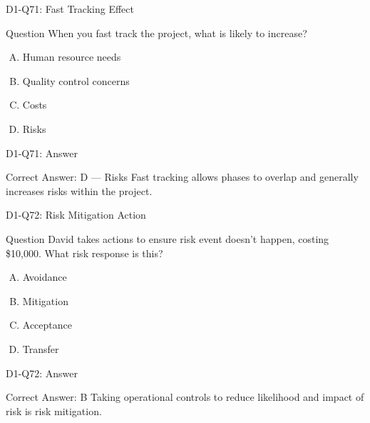\documentclass{beamer}
\begin{document}
	\begin{frame}{D1-Q71: Fast Tracking Effect}
		\begin{block}{Question}
			When you fast track the project, what is likely to increase?
		\end{block}
		\begin{enumerate}[(A)]
			\item Human resource needs
			\item Quality control concerns
			\item Costs
			\item Risks
		\end{enumerate}
	\end{frame}
	\begin{frame}{D1-Q71: Answer}
		\begin{block}{Correct Answer: D --- Risks}
			Fast tracking allows phases to overlap and generally increases risks within the project.
		\end{block}
	\end{frame}
	
	\begin{frame}{D1-Q72: Risk Mitigation Action}
		\begin{block}{Question}
			David takes actions to ensure risk event doesn't happen, costing \$10,000. What risk response is this?
		\end{block}
		\begin{enumerate}[(A)]
			\item Avoidance
			\item Mitigation
			\item Acceptance
			\item Transfer
		\end{enumerate}
	\end{frame}
	\begin{frame}{D1-Q72: Answer}
		\begin{block}{Correct Answer: B}
			Taking operational controls to reduce likelihood and impact of risk is risk mitigation.
		\end{block}
	\end{frame}
	
\end{document}
